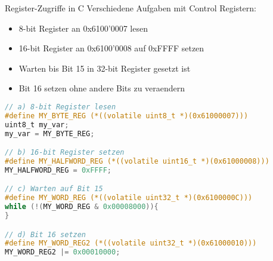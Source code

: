 \begin{example2}{Register-Zugriffe in C}
    Verschiedene Aufgaben mit Control Registern:
    
    \begin{itemize}
        \item 8-bit Register an 0x6100'0007 lesen
        \item 16-bit Register an 0x6100'0008 auf 0xFFFF setzen
        \item Warten bis Bit 15 in 32-bit Register gesetzt ist
        \item Bit 16 setzen ohne andere Bits zu veraendern
    \end{itemize}

\begin{lstlisting}[language=C, style=basesmol]
// a) 8-bit Register lesen
#define MY_BYTE_REG (*((volatile uint8_t *)(0x61000007)))
uint8_t my_var;
my_var = MY_BYTE_REG;

// b) 16-bit Register setzen
#define MY_HALFWORD_REG (*((volatile uint16_t *)(0x61000008)))
MY_HALFWORD_REG = 0xFFFF;

// c) Warten auf Bit 15
#define MY_WORD_REG (*((volatile uint32_t *)(0x6100000C)))
while (!(MY_WORD_REG & 0x00008000)){
}

// d) Bit 16 setzen
#define MY_WORD_REG2 (*((volatile uint32_t *)(0x61000010)))
MY_WORD_REG2 |= 0x00010000;
\end{lstlisting}
\end{example2}

